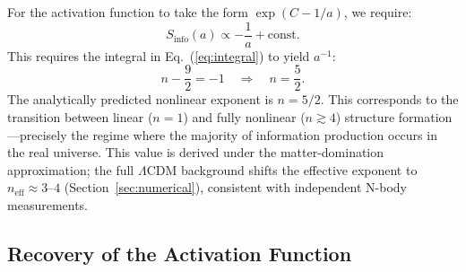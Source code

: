 \documentclass[11pt]{article}
\begin{document}
For the activation function to take the form
$\exp(C - 1/a)$, we require:
\begin{equation}
S_\mathrm{info}(a) \propto -\frac{1}{a} + \text{const}.
\end{equation}
This requires the integral in Eq.~(\ref{eq:integral}) to yield $a^{-1}$:
\begin{equation}
n - \frac{9}{2} = -1 \quad\Longrightarrow\quad \boxed{n = \frac{5}{2}}.
\label{eq:critical_n}
\end{equation}
The analytically predicted nonlinear exponent is $n = 5/2$.  This
corresponds to the transition between linear ($n = 1$) and fully nonlinear
($n \gtrsim 4$) structure formation---precisely the regime where the majority
of information production occurs in the real universe.  This value is derived
under the matter-domination approximation; the full $\Lambda$CDM background
shifts the effective exponent to $n_\mathrm{eff} \approx 3$--$4$
(Section~\ref{sec:numerical}), consistent with independent N-body
measurements.

\subsection{Recovery of the Activation Function}
\end{document}
